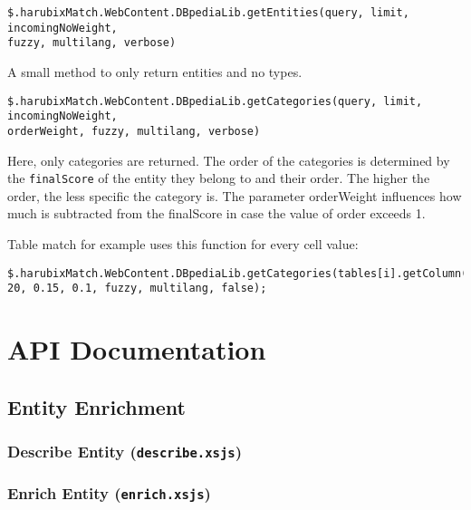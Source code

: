 \scriptsize
\begin{verbatim}
$.harubixMatch.WebContent.DBpediaLib.getEntities(query, limit, incomingNoWeight,
fuzzy, multilang, verbose)
\end{verbatim}
\normalsize

A small method to only return entities and no types.

\scriptsize
\begin{verbatim}
$.harubixMatch.WebContent.DBpediaLib.getCategories(query, limit, incomingNoWeight,
orderWeight, fuzzy, multilang, verbose)
\end{verbatim}
\normalsize

Here, only categories are returned. The order of the categories is determined by the \texttt{finalScore} of the entity they belong to and their order. The higher the order, the less specific the category is. The parameter orderWeight influences how much is subtracted from the finalScore in case the value of order exceeds 1.

Table match for example uses this function for every cell value:

\scriptsize
\begin{verbatim}
$.harubixMatch.WebContent.DBpediaLib.getCategories(tables[i].getColumn(j).getCell(k).getValue(),
20, 0.15, 0.1, fuzzy, multilang, false);
\end{verbatim}
\normalsize

\section{API Documentation}

\subsection{Entity Enrichment}

\subsubsection{Describe Entity (\texttt{describe.xsjs})}



\subsubsection{Enrich Entity (\texttt{enrich.xsjs})}

